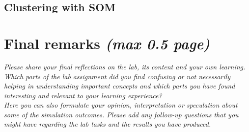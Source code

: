 \documentclass[a4paper]{article}
\begin{document}
\subsection{Clustering with SOM}

\section{Final remarks \normalsize{\textit{(max 0.5 page)}}}
\textit{Please share your final reflections on the lab, its content and your own learning. Which parts of the lab assignment did you find confusing or not necessarily helping in understanding important concepts and which parts you have found interesting and relevant to your learning experience? \\
Here you can also formulate your opinion, interpretation or speculation about some of the simulation outcomes. Please add any follow-up questions that you might have regarding the lab tasks and the results you have produced.}
\end{document}
